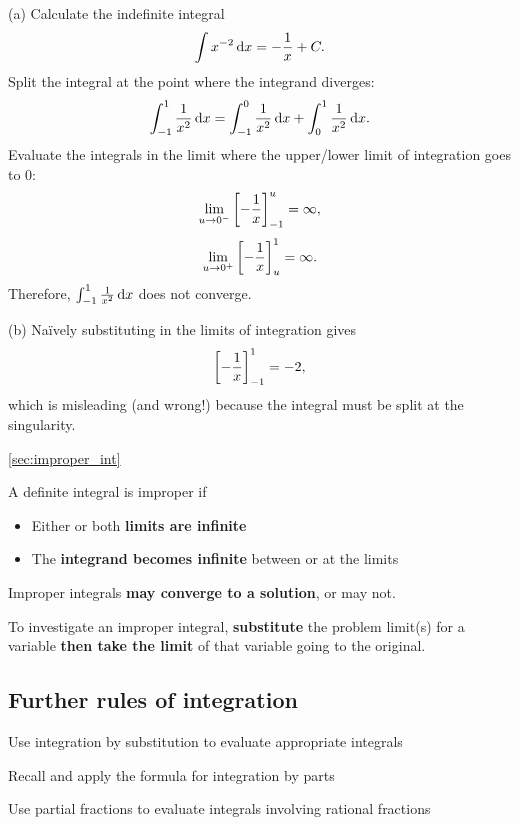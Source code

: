 \begin{solution}
(a) Calculate the indefinite integral
\[
\int x^{-2}\,{\rm d}x=-\frac{1}{x}+C.
\]
Split the integral at the point where the integrand diverges:
\[
\int_{-1}^1\frac{1}{x^2}\,{\rm d}x
=\int_{-1}^0\frac{1}{x^2}\,{\rm d}x+\int_0^1\frac{1}{x^2}\,{\rm d}x.
\]
Evaluate the integrals in the limit where the upper/lower limit of integration goes to 0:
\[
\lim_{u\to0^-}\left[-\frac{1}{x}\right]_{-1}^{u}
=\infty,
\]
\[
\lim_{u\to0^+}\left[-\frac{1}{x}\right]_{u}^{1}
=\infty.
\]
Therefore, $\int_{-1}^1\frac{1}{x^2}\,{\rm d}x$ does not converge.

(b) Na{\"i}vely substituting in the limits of integration gives
\[
\left[-\frac{1}{x}\right]_{-1}^{1}=-2,
\]
which is misleading (and wrong!) because the integral must be split at the singularity.
\end{solution}

\begin{recap}{\ref{sec:improper_int}}
\item A definite integral is improper if
\begin{itemize}
\item Either or both \textbf{limits are infinite}
\item The \textbf{integrand becomes infinite} between or at the limits
\end{itemize}
\item Improper integrals \textbf{may converge to a solution}, or may not.
\item To investigate an improper integral, \textbf{substitute} the problem limit(s) for a variable \textbf{then take the limit} of that variable going to the original.
\end{recap}

\subsection{Further rules of integration}
\label{sec:further_int}

\begin{learningoutcomes}
\item Use integration by substitution to evaluate appropriate integrals
\item Recall and apply the formula for integration by parts
\item Use partial fractions to evaluate integrals involving rational fractions
\end{learningoutcomes}

